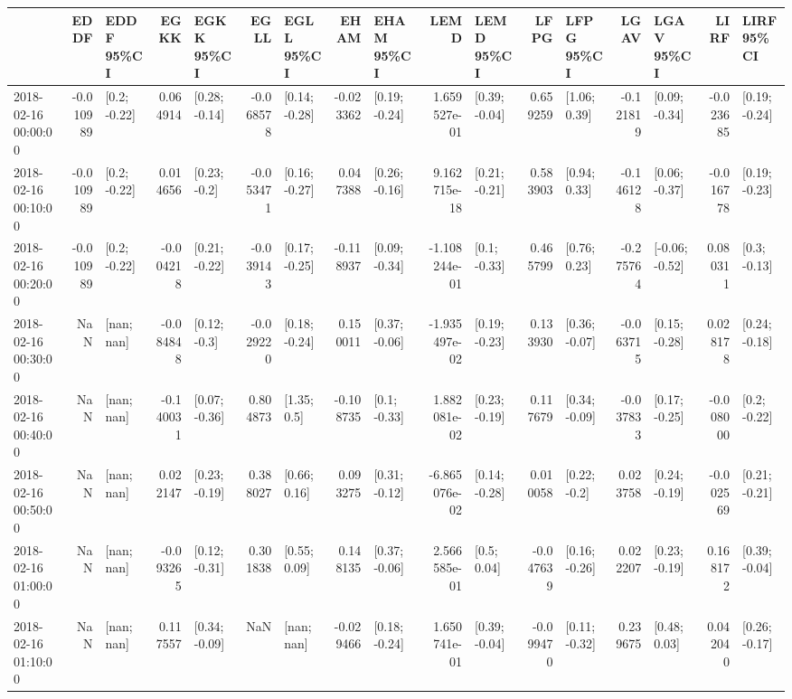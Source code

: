 \begin{tabular}{lrlrlrlrlrlrlrlrl}
\toprule
{} &      EDDF &      EDDF 95\%CI &      EGKK &      EGKK 95\%CI &      EGLL &      EGLL 95\%CI &      EHAM &      EHAM 95\%CI &          LEMD &      LEMD 95\%CI &      LFPG &      LFPG 95\%CI &      LGAV &      LGAV 95\%CI &      LIRF &      LIRF 95\%CI \\
\midrule
2018-02-16 00:00:00 & -0.010989 &    [0.2; -0.22] &  0.064914 &   [0.28; -0.14] & -0.068578 &   [0.14; -0.28] & -0.023362 &   [0.19; -0.24] &  1.659527e-01 &   [0.39; -0.04] &  0.659259 &    [1.06; 0.39] & -0.121819 &   [0.09; -0.34] & -0.023685 &   [0.19; -0.24] \\
2018-02-16 00:10:00 & -0.010989 &    [0.2; -0.22] &  0.014656 &    [0.23; -0.2] & -0.053471 &   [0.16; -0.27] &  0.047388 &   [0.26; -0.16] &  9.162715e-18 &   [0.21; -0.21] &  0.583903 &    [0.94; 0.33] & -0.146128 &   [0.06; -0.37] & -0.016778 &   [0.19; -0.23] \\
2018-02-16 00:20:00 & -0.010989 &    [0.2; -0.22] & -0.004218 &   [0.21; -0.22] & -0.039143 &   [0.17; -0.25] & -0.118937 &   [0.09; -0.34] & -1.108244e-01 &    [0.1; -0.33] &  0.465799 &    [0.76; 0.23] & -0.275764 &  [-0.06; -0.52] &  0.080311 &    [0.3; -0.13] \\
2018-02-16 00:30:00 &       NaN &      [nan; nan] & -0.084848 &    [0.12; -0.3] & -0.029220 &   [0.18; -0.24] &  0.150011 &   [0.37; -0.06] & -1.935497e-02 &   [0.19; -0.23] &  0.133930 &   [0.36; -0.07] & -0.063715 &   [0.15; -0.28] &  0.028178 &   [0.24; -0.18] \\
2018-02-16 00:40:00 &       NaN &      [nan; nan] & -0.140031 &   [0.07; -0.36] &  0.804873 &     [1.35; 0.5] & -0.108735 &    [0.1; -0.33] &  1.882081e-02 &   [0.23; -0.19] &  0.117679 &   [0.34; -0.09] & -0.037833 &   [0.17; -0.25] & -0.008000 &    [0.2; -0.22] \\
2018-02-16 00:50:00 &       NaN &      [nan; nan] &  0.022147 &   [0.23; -0.19] &  0.388027 &    [0.66; 0.16] &  0.093275 &   [0.31; -0.12] & -6.865076e-02 &   [0.14; -0.28] &  0.010058 &    [0.22; -0.2] &  0.023758 &   [0.24; -0.19] & -0.002569 &   [0.21; -0.21] \\
2018-02-16 01:00:00 &       NaN &      [nan; nan] & -0.093265 &   [0.12; -0.31] &  0.301838 &    [0.55; 0.09] &  0.148135 &   [0.37; -0.06] &  2.566585e-01 &     [0.5; 0.04] & -0.047639 &   [0.16; -0.26] &  0.022207 &   [0.23; -0.19] &  0.168172 &   [0.39; -0.04] \\
2018-02-16 01:10:00 &       NaN &      [nan; nan] &  0.117557 &   [0.34; -0.09] &       NaN &      [nan; nan] & -0.029466 &   [0.18; -0.24] &  1.650741e-01 &   [0.39; -0.04] & -0.099470 &   [0.11; -0.32] &  0.239675 &    [0.48; 0.03] &  0.042040 &   [0.26; -0.17] \\

\end{tabular}
